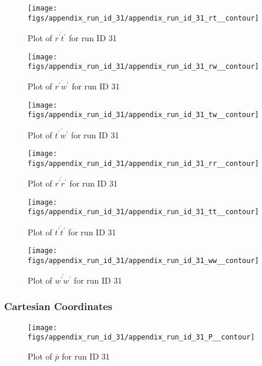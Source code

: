 \begin{figure}[H]
\centering
\texttt{[image: figs/appendix\_run\_id\_31/appendix\_run\_id\_31\_rt\_\_contour]}
\caption{Plot of $\overline{r^\prime t^\prime}$ for run ID 31}
\label{fig:appendix_run_id_31_rt__contour}
\end{figure}


\begin{figure}[H]
\centering
\texttt{[image: figs/appendix\_run\_id\_31/appendix\_run\_id\_31\_rw\_\_contour]}
\caption{Plot of $\overline{r^\prime w^\prime}$ for run ID 31}
\label{fig:appendix_run_id_31_rw__contour}
\end{figure}


\begin{figure}[H]
\centering
\texttt{[image: figs/appendix\_run\_id\_31/appendix\_run\_id\_31\_tw\_\_contour]}
\caption{Plot of $\overline{t^\prime w^\prime}$ for run ID 31}
\label{fig:appendix_run_id_31_tw__contour}
\end{figure}


\begin{figure}[H]
\centering
\texttt{[image: figs/appendix\_run\_id\_31/appendix\_run\_id\_31\_rr\_\_contour]}
\caption{Plot of $\overline{r^\prime r^\prime}$ for run ID 31}
\label{fig:appendix_run_id_31_rr__contour}
\end{figure}


\begin{figure}[H]
\centering
\texttt{[image: figs/appendix\_run\_id\_31/appendix\_run\_id\_31\_tt\_\_contour]}
\caption{Plot of $\overline{t^\prime t^\prime}$ for run ID 31}
\label{fig:appendix_run_id_31_tt__contour}
\end{figure}


\begin{figure}[H]
\centering
\texttt{[image: figs/appendix\_run\_id\_31/appendix\_run\_id\_31\_ww\_\_contour]}
\caption{Plot of $\overline{w^\prime w^\prime}$ for run ID 31}
\label{fig:appendix_run_id_31_ww__contour}
\end{figure}


\subsubsection{Cartesian Coordinates}
\begin{figure}[H]
\centering
\texttt{[image: figs/appendix\_run\_id\_31/appendix\_run\_id\_31\_P\_\_contour]}
\caption{Plot of $\overline{p}$ for run ID 31}
\label{fig:appendix_run_id_31_P__contour}
\end{figure}


